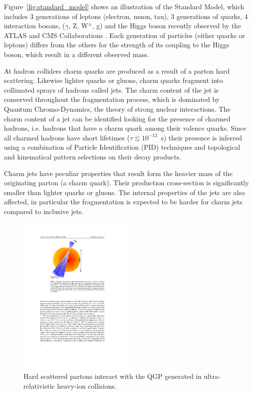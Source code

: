 \documentclass[12pt, a4paper, twoside, titlepage]{article}
\begin{document}
Figure~\ref{fig:standard_model} shows an illustration of the Standard Model, which includes
3 generations of leptons (electron, muon, tau), 3 generations of quarks, 4 interaction bosons, ($\gamma$, Z, $\mathrm{W}^{\pm}$, g) and the Higgs boson
recently observed by the ATLAS and CMS Collaborations \cite{ATLAS:2012b,CMS:2012d}.
Each generation of particles (either quarks or leptons) differs from the others for the strength of its coupling to the Higgs boson,
which result in a different observed mass.

At hadron colliders charm quarks are produced as a result of a parton hard scattering. Likewise lighter quarks or gluons, charm quarks
fragment into collimated sprays of hadrons called jets. The charm content of the jet is conserved throughout the fragmentation process,
which is dominated by Quantum Chromo-Dynamics, the theory of strong nuclear interactions.
The charm content of a jet can be identified looking for the presence of charmed hadrons, i.e. hadrons that have
a charm quark among their valence quarks. Since all charmed hadrons have short lifetimes ($\tau \lesssim 10^{-12}$~s) their presence is inferred
using a combination of Particle Identification (PID) techniques and topological and kinematical pattern selections on their decay products.

Charm jets have peculiar properties that result form the heavier mass of the originating parton (a charm quark).
Their production cross-section is significantly smaller than lighter quarks or gluons. The internal
properties of the jets are also affected, in particular the fragmentation is expected to be harder for charm jets compared to inclusive jets.

\begin{figure}[tbh]
\begin{center}
\includegraphics[width=0.5\textwidth]{img/jetquenching}
 \caption{Hard scattered partons interact with the QGP generated in ultra-relativistic heavy-ion collisions.} 
 \label{fig:jetquenching}
\end{center}
\end{figure}
\end{document}
